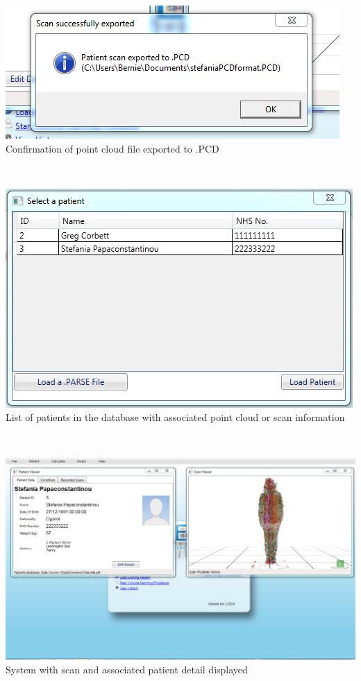 \begin{center}
    \includegraphics[scale=0.6]{zscreenshots/savetopcd.PNG}\\
    \caption{Confirmation of point cloud file exported to .PCD}
\end{center} \\

\begin{center}
    \includegraphics[scale=0.55]{zscreenshots/metaloader.PNG}\\
    \caption{List of patients in the database with associated point cloud or scan information}
\end{center} \\

\begin{center}
    \includegraphics[scale=0.3]{zscreenshots/coreloaderstef.PNG}\\
    \caption{System with scan and associated patient detail displayed}
\end{center} \\


